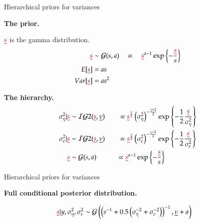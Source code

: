 \documentclass[notes,blackandwhite,mathsans,usenames,dvipsnames]{beamer}
\begin{document}
\begin{frame}{Hierarchical priors for variances}

\bigskip\textbf{The prior.}

 ${\color{purple}\underline{s}}$ {\color{mcxs2}is the gamma distribution.}
\begin{align*}
{\color{purple}\underline{s}}&\sim \mathcal{G}(s,a) \quad\propto\quad  {\color{purple}\underline{s}}^{a-1}\exp\left\{ -\frac{{\color{purple}\underline{s}}}{s} \right\}\\
E[{\color{purple}\underline{s}}]&=as\\
Var[{\color{purple}\underline{s}}]&=as^2 
\end{align*}


\bigskip\textbf{The hierarchy.}
\begin{align*}
\sigma^2_\eta|{\color{purple}\underline{s}} &\sim\mathcal{IG}2({\color{purple}\underline{s}},\underline{\nu})
\qquad\propto {\color{purple}\underline{s}}^{\frac{\underline\nu}{2}}\left(\sigma^2_\eta\right)^{-\frac{\underline\nu+2}{2}}\exp\left\{-\frac{1}{2}\frac{{\color{purple}\underline{s}}}{\sigma^2_\eta} \right\}
\\
\sigma^2_e|{\color{purple}\underline{s}} &\sim\mathcal{IG}2({\color{purple}\underline{s}},\underline{\nu})
\qquad\propto {\color{purple}\underline{s}}^{\frac{\underline\nu}{2}}\left(\sigma^2_e\right)^{-\frac{\underline\nu+2}{2}}\exp\left\{-\frac{1}{2}\frac{{\color{purple}\underline{s}}}{\sigma^2_e} \right\}
\\
{\color{purple}\underline{s}}&\sim\mathcal{G}(s,a)\quad\quad\quad
\propto {\color{purple}\underline{s}}^{a-1}\exp\left\{ -\frac{{\color{purple}\underline{s}}}{s}\right\}
\end{align*}

\end{frame}





\begin{frame}{Hierarchical priors for variances}

\bigskip\textbf{Full conditional posterior distribution.}

\begin{align*}
{\color{purple}\underline{s}}|y,\sigma^2_\eta, \sigma^2_e &\sim\mathcal{G}\left( \left(s^{-1} + 0.5\left(\sigma^{-2}_\eta + \sigma^{-2}_e\right)\right)^{-1}, \underline\nu+a	\right)
\end{align*}

\end{frame}
\end{document}
